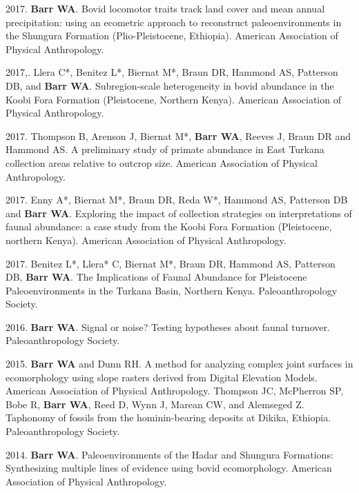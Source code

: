 \documentclass{article}
\begin{document}
\begin{etaremune}
\item 2017. {\bfseries Barr WA}. Bovid locomotor traits track land cover and mean annual precipitation: using an ecometric approach to reconstruct paleoenvironments in the Shungura Formation (Plio-Pleistocene, Ethiopia). American Association of Physical Anthropology.

\item 2017,. Llera C*, Benitez L*, Biernat M*, Braun DR,  Hammond AS, Patterson DB, and {\bfseries Barr WA}. Subregion-scale heterogeneity in bovid abundance in the Koobi Fora Formation (Pleistocene, Northern Kenya).  American Association of Physical Anthropology.

\item 2017. Thompson B, Arenson J, Biernat M*,  {\bfseries Barr WA}, Reeves J, Braun DR and Hammond AS. A preliminary study of primate abundance in East Turkana collection areas relative to outcrop size. American Association of Physical Anthropology.

\item 2017. Enny A*, Biernat M*, Braun DR, Reda W*, Hammond AS, Patterson DB and {\bfseries Barr WA}. Exploring the impact of collection strategies on interpretations of faunal abundance: a case study from the Koobi Fora Formation (Pleistocene, northern Kenya). American Association of Physical Anthropology.

\item 2017. Benitez L*, Llera* C, Biernat M*, Braun DR, Hammond AS, Patterson DB, {\bfseries Barr WA}. The Implications of Faunal Abundance for Pleistocene Paleoenvironments in the Turkana Basin, Northern Kenya. Paleoanthropology Society. 


\item 2016. {\bfseries Barr WA}. Signal or noise? Testing hypotheses about faunal turnover. Paleoanthropology Society. 


\item 2015. {\bfseries Barr WA} and Dunn RH. A method for analyzing complex joint surfaces in ecomorphology using slope rasters derived from Digital Elevation Models. American Association of Physical Anthropology.
Thompson JC, McPherron SP, Bobe R, {\bfseries Barr WA}, Reed D, Wynn J, Marean CW, and Alemseged Z. Taphonomy of fossils from the hominin-bearing deposits at Dikika, Ethiopia. Paleoanthropology Society.


\item 2014. {\bfseries Barr WA}. Paleoenvironments of the Hadar and Shungura Formations: Synthesizing multiple lines of evidence using bovid ecomorphology. American Association of Physical Anthropology.


\end{etaremune}
\end{document}
